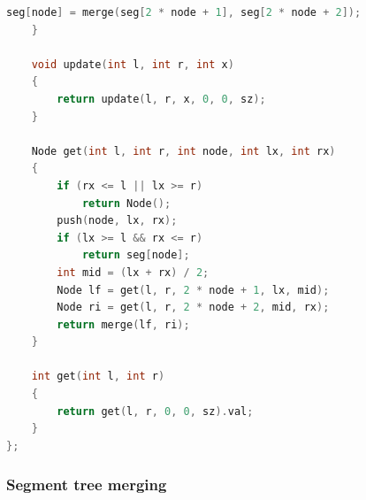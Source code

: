 \documentclass[10pt,landscape,a4paper,twocolumn]{article}
\begin{document}
\begin{lstlisting}[language=C++]
        seg[node] = merge(seg[2 * node + 1], seg[2 * node + 2]);
    }

    void update(int l, int r, int x)
    {
        return update(l, r, x, 0, 0, sz);
    }

    Node get(int l, int r, int node, int lx, int rx)
    {
        if (rx <= l || lx >= r)
            return Node();
        push(node, lx, rx);
        if (lx >= l && rx <= r)
            return seg[node];
        int mid = (lx + rx) / 2;
        Node lf = get(l, r, 2 * node + 1, lx, mid);
        Node ri = get(l, r, 2 * node + 2, mid, rx);
        return merge(lf, ri);
    }

    int get(int l, int r)
    {
        return get(l, r, 0, 0, sz).val;
    }
};

\end{lstlisting}
\subsubsection{Segment tree merging}
\end{document}
